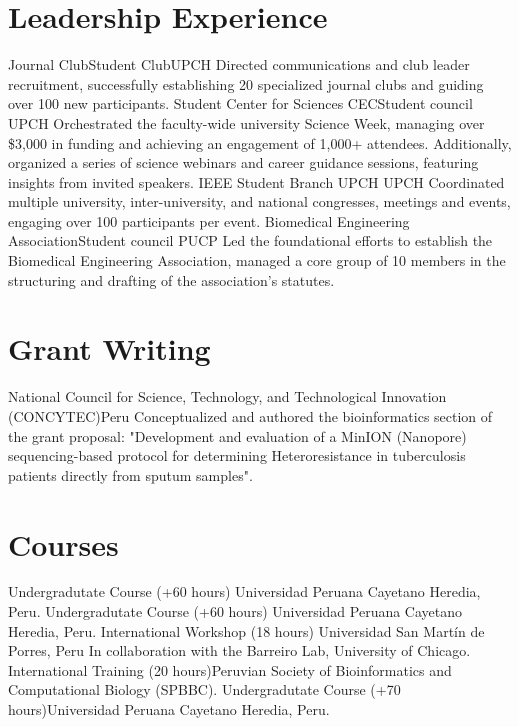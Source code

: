 \documentclass[11pt,a4paper,sans]{moderncv}
\begin{document}
\section{Leadership Experience}
  {Journal Club}{Student Club}{UPCH}
  {Directed communications and club leader recruitment, successfully establishing 20 specialized journal clubs and guiding over 100 new participants.
  }
  {Student Center for Sciences CEC}{Student council}
  {UPCH}
  {Orchestrated the faculty-wide university Science Week, managing over \$3,000 in funding and achieving an engagement of 1,000+ attendees. Additionally, organized a series of science webinars and career guidance sessions, featuring insights from invited speakers. 
  }
  {IEEE Student Branch UPCH}{}
  {UPCH}
  {Coordinated multiple university, inter-university, and national congresses, meetings and events, engaging over 100 participants per event.
  }
  {Biomedical Engineering Association}{Student council}
  {PUCP}
  {Led the foundational efforts to establish the Biomedical Engineering Association, managed a core group of 10 members in the structuring and drafting of the association’s statutes.
  }



\section{Grant Writing}
  {National Council for Science, Technology, and Technological Innovation (CONCYTEC)}{Peru}
  {}
  {Conceptualized and authored the bioinformatics section of the grant proposal: "Development and evaluation of a MinION (Nanopore) sequencing-based protocol for determining
Heteroresistance in tuberculosis patients directly from sputum samples".
}

\section{Courses}
  {Undergradutate Course (+60 hours)}
  {Universidad Peruana Cayetano Heredia, Peru.}
  {}
  {}
  {Undergradutate Course (+60 hours)}
  {Universidad Peruana Cayetano Heredia, Peru.}
  {}
  {}
  {International Workshop (18 hours)}
  {Universidad San Martín de Porres, Peru}
  {In collaboration with the Barreiro Lab, University of Chicago.}
  {}
  {International Training (20 hours)}{Peruvian Society of Bioinformatics and Computational Biology (SPBBC).}{}
  {}  
  {Undergradutate Course (+70 hours)}{Universidad Peruana Cayetano Heredia, Peru.}{}
  {}
\end{document}
